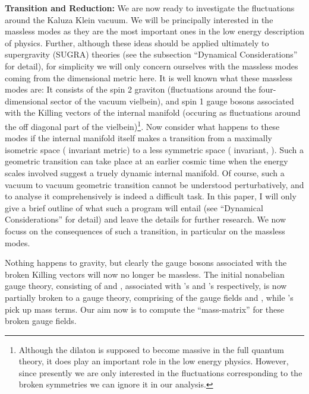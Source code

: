 \documentclass[a4paper,12pt]{article}
\begin{document}
{\bf Transition and Reduction:} We are now ready to investigate the fluctuations around the Kaluza Klein vacuum. We will be principally interested in the massless modes as they are the most important ones in the low energy description of physics. Further, although these ideas should be applied ultimately to supergravity (SUGRA) theories (see the subsection ``Dynamical Considerations'' for detail), for simplicity we will only concern ourselves  with the massless modes coming from the \coordHE{} dimensional metric here. It is  well known what these massless modes are: It consists of the spin 2 graviton (fluctuations around the four-dimensional sector of the vacuum vielbein), and spin 1 gauge bosons associated with the Killing vectors of the internal manifold (occuring as fluctuations around the off diagonal part of the vielbein)\footnote{Although the dilaton is supposed to become massive in the full quantum theory, it does play an important role in the low energy physics. However, since presently we are only interested in the fluctuations corresponding to the broken symmetries we can ignore it in our analysis.}. Now consider what happens to these modes if the internal manifold itself makes a transition from a maximally isometric space (\coordHE{} invariant metric) to a less symmetric space (\coordHE{} invariant, \coordHE{}).  Such a geometric transition can take place at an earlier cosmic time when the energy scales involved suggest a truely dynamic internal manifold. Of course, such a vacuum to vacuum geometric transition  cannot be understood  perturbatively, and to analyse it comprehensively is indeed a difficult task. In this paper, I will only give a brief outline of what such a program will entail (see ``Dynamical Considerations'' for detail) and leave the details for further research. We now focuss on the consequences of such a transition, in particular on the massless modes. 

Nothing happens to gravity, but clearly the gauge bosons associated with the broken  Killing vectors will now no longer be massless. The initial \coordHE{} nonabelian gauge theory, consisting of  \coordHE{} and \coordHE{}, associated with \myHighlight{$\ti{\es}_{\as}$}\coordHE{}'s and \myHighlight{$\es_{\as}$}\coordHE{}'s respectively, is now partially broken  to a \coordHE{} gauge theory, comprising of the gauge fields \coordHE{} and \coordHE{}, while \coordHE{}'s pick up  mass terms. Our aim now is to compute the ``mass-matrix'' for these broken gauge fields.
\end{document}
